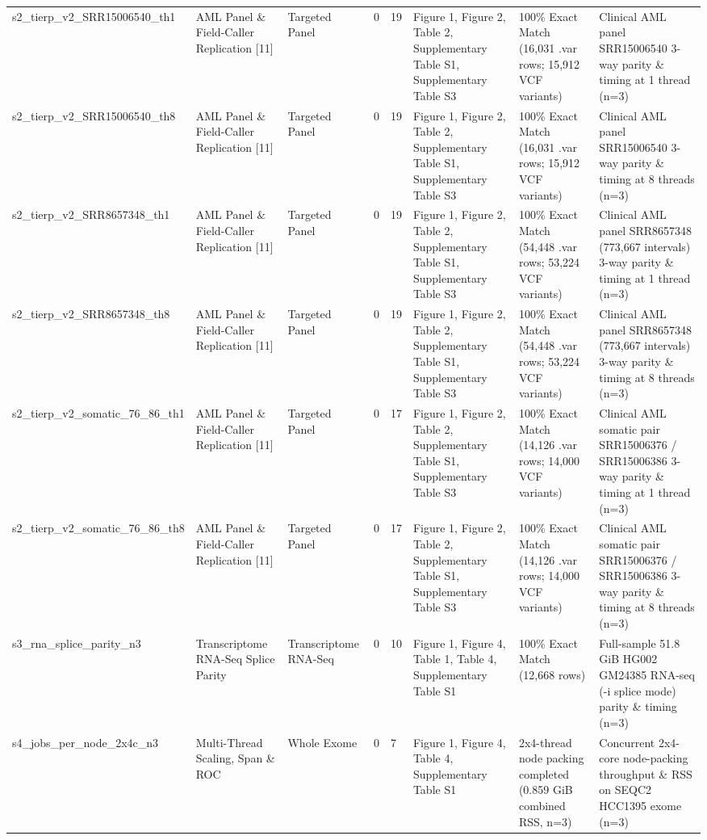 \begin{table}[htbp]
{\begin{tabular}{llllllll}
s2\_tierp\_v2\_SRR15006540\_th1 & AML Panel \& Field-Caller Replication [11] & Targeted Panel & 0 & 19 & Figure 1, Figure 2, Table 2, Supplementary Table S1, Supplementary Table S3 & 100\% Exact Match (16,031 .var rows; 15,912 VCF variants) & Clinical AML panel SRR15006540 3-way parity \& timing at 1 thread (n=3) \\
s2\_tierp\_v2\_SRR15006540\_th8 & AML Panel \& Field-Caller Replication [11] & Targeted Panel & 0 & 19 & Figure 1, Figure 2, Table 2, Supplementary Table S1, Supplementary Table S3 & 100\% Exact Match (16,031 .var rows; 15,912 VCF variants) & Clinical AML panel SRR15006540 3-way parity \& timing at 8 threads (n=3) \\
s2\_tierp\_v2\_SRR8657348\_th1 & AML Panel \& Field-Caller Replication [11] & Targeted Panel & 0 & 19 & Figure 1, Figure 2, Table 2, Supplementary Table S1, Supplementary Table S3 & 100\% Exact Match (54,448 .var rows; 53,224 VCF variants) & Clinical AML panel SRR8657348 (773,667 intervals) 3-way parity \& timing at 1 thread (n=3) \\
s2\_tierp\_v2\_SRR8657348\_th8 & AML Panel \& Field-Caller Replication [11] & Targeted Panel & 0 & 19 & Figure 1, Figure 2, Table 2, Supplementary Table S1, Supplementary Table S3 & 100\% Exact Match (54,448 .var rows; 53,224 VCF variants) & Clinical AML panel SRR8657348 (773,667 intervals) 3-way parity \& timing at 8 threads (n=3) \\
s2\_tierp\_v2\_somatic\_76\_86\_th1 & AML Panel \& Field-Caller Replication [11] & Targeted Panel & 0 & 17 & Figure 1, Figure 2, Table 2, Supplementary Table S1, Supplementary Table S3 & 100\% Exact Match (14,126 .var rows; 14,000 VCF variants) & Clinical AML somatic pair SRR15006376 / SRR15006386 3-way parity \& timing at 1 thread (n=3) \\
s2\_tierp\_v2\_somatic\_76\_86\_th8 & AML Panel \& Field-Caller Replication [11] & Targeted Panel & 0 & 17 & Figure 1, Figure 2, Table 2, Supplementary Table S1, Supplementary Table S3 & 100\% Exact Match (14,126 .var rows; 14,000 VCF variants) & Clinical AML somatic pair SRR15006376 / SRR15006386 3-way parity \& timing at 8 threads (n=3) \\
s3\_rna\_splice\_parity\_n3 & Transcriptome RNA-Seq Splice Parity & Transcriptome RNA-Seq & 0 & 10 & Figure 1, Figure 4, Table 1, Table 4, Supplementary Table S1 & 100\% Exact Match (12,668 rows) & Full-sample 51.8 GiB HG002 GM24385 RNA-seq (-i splice mode) parity \& timing (n=3) \\
s4\_jobs\_per\_node\_2x4c\_n3 & Multi-Thread Scaling, Span \& ROC & Whole Exome & 0 & 7 & Figure 1, Figure 4, Table 4, Supplementary Table S1 & 2x4-thread node packing completed (0.859 GiB combined RSS, n=3) & Concurrent 2x4-core node-packing throughput \& RSS on SEQC2 HCC1395 exome (n=3) \\

\end{tabular}}
\end{table}
